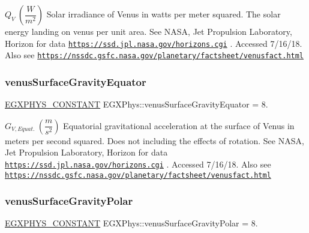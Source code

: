 $ Q_{V} \ (\dfrac{W}{m^2})$ Solar irradiance of Venus in watts per meter squared. The solar energy landing on venus per unit area. See N\+A\+SA, Jet Propulsion Laboratory, Horizon for data \href{https://ssd.jpl.nasa.gov/horizons.cgi}{\tt https\+://ssd.\+jpl.\+nasa.\+gov/horizons.\+cgi} . Accessed 7/16/18. Also see \href{https://nssdc.gsfc.nasa.gov/planetary/factsheet/venusfact.html}{\tt https\+://nssdc.\+gsfc.\+nasa.\+gov/planetary/factsheet/venusfact.\+html} \mbox{\label{group___e_g_x_phys-_constants-_astrophysics-_solar_system-_venus-_bulk_gaa8dbde50f4c15891fa640c713f27d6ff}} 
\subsubsection{\texorpdfstring{venus\+Surface\+Gravity\+Equator}{venusSurfaceGravityEquator}}
{\footnotesize\ttfamily \mbox{\hyperlink{group___e_g_x_phys-_constants-_macros_ga76980d288494ce1714c9ac68a95ba702}{E\+G\+X\+P\+H\+Y\+S\+\_\+\+C\+O\+N\+S\+T\+A\+NT}} E\+G\+X\+Phys\+::venus\+Surface\+Gravity\+Equator = 8.}

$ G_{V,Equat.} \ (\dfrac{m}{s^2})$ Equatorial gravitational acceleration at the surface of Venus in meters per second squared. Does not including the effects of rotation. See N\+A\+SA, Jet Propulsion Laboratory, Horizon for data \href{https://ssd.jpl.nasa.gov/horizons.cgi}{\tt https\+://ssd.\+jpl.\+nasa.\+gov/horizons.\+cgi} . Accessed 7/16/18. Also see \href{https://nssdc.gsfc.nasa.gov/planetary/factsheet/venusfact.html}{\tt https\+://nssdc.\+gsfc.\+nasa.\+gov/planetary/factsheet/venusfact.\+html} \mbox{\label{group___e_g_x_phys-_constants-_astrophysics-_solar_system-_venus-_bulk_gae6530375b31eeb2a06adeb17a83e0307}} 
\subsubsection{\texorpdfstring{venus\+Surface\+Gravity\+Polar}{venusSurfaceGravityPolar}}
{\footnotesize\ttfamily \mbox{\hyperlink{group___e_g_x_phys-_constants-_macros_ga76980d288494ce1714c9ac68a95ba702}{E\+G\+X\+P\+H\+Y\+S\+\_\+\+C\+O\+N\+S\+T\+A\+NT}} E\+G\+X\+Phys\+::venus\+Surface\+Gravity\+Polar = 8.}

